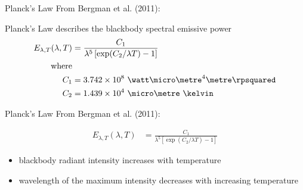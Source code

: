 \begin{frame}{Planck's Law}
From Bergman et al. (2011):
\begin{fancydefs}
Planck's Law describes the blackbody spectral emissive power
\begin{align*}
E_{\lambda,T} (\lambda,T) &= \frac{C_1}{\lambda^5 \left[\exp (C_2/ \lambda T) - 1 \right] }\\
\text{where}\\
C_1 &= 3.742 \times 10^8\ \watt \micro\metre^4 \metre\rpsquared\\
C_2 &= 1.439 \times 10^4\ \micro\metre\ \kelvin	
\end{align*}
\end{fancydefs}
\end{frame}

\begin{frame}{Planck's Law}
From Bergman et al. (2011):
\begin{fancydefs}
\begin{align*}
E_{\lambda,T} (\lambda,T) &= \frac{C_1}{\lambda^5 \left[\exp (C_2/ \lambda T) - 1 \right] }
\end{align*}
\end{fancydefs}
\begin{itemize}
	\item blackbody radiant intensity increases with temperature
	\item wavelength of the maximum intensity decreases with increasing temperature
\end{itemize}
\end{frame}

